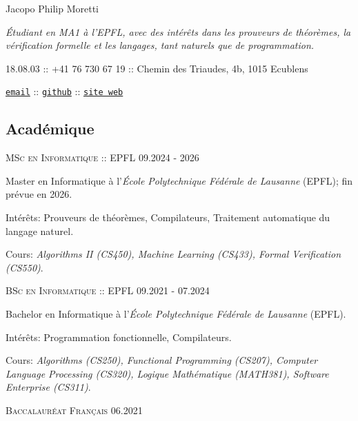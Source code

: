 \documentclass[10pt]{article}
\renewcommand{\url}[1]{{\texttt{#1}}}
\renewcommand{\line}[2]{{\vspace{4pt} \large \noindent\textsc{#1} \hfill \small{#2}}\vspace{4pt}}
\begin{document}
  \setlength{\parindent}{0em}

  \begin{center}
    \begin{minipage}[C]{0.66\textwidth}
      \begin{center}
        \huge Jacopo Philip Moretti
      \end{center}
      \textit{Étudiant en MA1 à l'EPFL, avec des intérêts dans les prouveurs de théorèmes, la vérification formelle et les langages, tant naturels que de programmation.}

      18.08.03 :: +41 76 730 67 19 :: Chemin des Triaudes, 4b, 1015 Ecublens
      \vspace{-0.75em}
      \begin{center}
        \href{https://people.epfl.ch/jacopo.moretti}{\url{email}} :: \href{https://github.com/quartztz}{\url{github}} :: \href{https://quartztz.github.io}{\url{site web}}
      \end{center}
    \end{minipage}
  \end{center}

  \subsection*{Académique}

  \line{MSc en Informatique :: EPFL}{09.2024 - 2026}

  Master en Informatique à l'\textit{École Polytechnique Fédérale de Lausanne} (EPFL); fin prévue en 2026.

  Intérêts: Prouveurs de théorèmes, Compilateurs, Traitement automatique du langage naturel.

  Cours: \textit{Algorithms II (CS450), Machine Learning (CS433), Formal Verification (CS550)}.
  \vspace{0.5em}

  \line{BSc en Informatique :: EPFL}{09.2021 - 07.2024}

  Bachelor en Informatique à l'\textit{École Polytechnique Fédérale de Lausanne} (EPFL).

  Intérêts: Programmation fonctionnelle, Compilateurs.

  Cours: \textit{Algorithms (CS250), Functional Programming (CS207), Computer Language Processing (CS320), Logique Mathématique (MATH381), Software Enterprise (CS311)}.
  \vspace{0.5em}

  \line{Baccalauréat Français}{06.2021}
\end{document}
